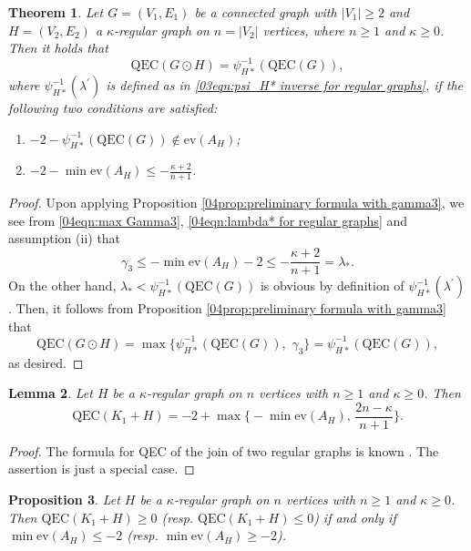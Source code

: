 \documentclass[12pt,a4paper]{article}
\newtheorem{theorem}{Theorem}[section]
\newtheorem{proposition}[theorem]{Proposition}
\newtheorem{lemma}[theorem]{Lemma}
\newcommand{\1}{{\bm 1}}
\numberwithin{equation}{section}
\begin{document}
\begin{theorem}\label{04thm:main formula for regular graph}
Let $G=(V_1,E_1)$ be a connected graph with $|V_1|\ge2$
and $H=(V_2,E_2)$ a $\kappa$-regular graph on $n=|V_2|$
vertices, where $n\ge1$ and $\kappa\ge0$.
Then it holds that
%
\begin{equation}\label{03eqn:QEC(GoH) for a regular H}
\mathrm{QEC}(G\odot H)
=\psi_{H*}^{-1}(\mathrm{QEC}(G)),
\end{equation}
%
where $\psi_{H*}^{-1}(\lambda^\prime)$ is defined as in
\eqref{03eqn:psi_H* inverse for regular graphs},
if the following two conditions are satisfied:
%
\begin{enumerate}
\item[\upshape (i)] 
$-2-\psi_{H*}^{-1}(\mathrm{QEC}(G)) \not\in\mathrm{ev}(A_H)$;
\item[\upshape (ii)]
$\displaystyle -2-\min\mathrm{ev}(A_H)\le -\frac{\kappa+2}{n+1}$.
\end{enumerate}
\end{theorem}

\begin{proof}
Upon applying Proposition \ref{04prop:preliminary formula with gamma3},
we see from \eqref{04eqn:max Gamma3}, 
\eqref{04eqn:lambda* for regular graphs}
and assumption (ii) that
\[
\gamma_3
\le -\min\mathrm{ev}(A_H)-2
\le -\frac{\kappa+2}{n+1}
=\lambda_*.
\]
On the other hand, 
$\lambda_*<\psi_{H*}^{-1}(\mathrm{QEC}(G))$ is obvious
by definition of $\psi_{H*}^{-1}(\lambda^\prime)$.
Then, it follows from
Proposition \ref{04prop:preliminary formula with gamma3} that
\[
\mathrm{QEC}(G\odot H)
=\max \{\psi_{H*}^{-1}(\mathrm{QEC}(G)),\,\,\gamma_3\}
=\psi_{H*}^{-1}(\mathrm{QEC}(G)),
\]
as desired.
\end{proof}


\begin{lemma}\label{04lem:QEC(K1+H) for regular H}
Let $H$ be a $\kappa$-regular graph on $n$ vertices
with $n\ge1$ and $\kappa\ge0$.
Then 
\[
\mathrm{QEC}(K_1+H)
=-2+\max\bigg\{-\min\mathrm{ev}(A_H),\, \frac{2n-\kappa}{n+1}\bigg\}.
\]
\end{lemma}

\begin{proof}
The formula for QEC of the join of two regular graphs is known
\cite{Lou-Obata-Huang2022}.
The assertion is just a special case.
\end{proof}

\begin{proposition}\label{04prop:QEC(K1+H)=0 case}
Let $H$ be a $\kappa$-regular graph on $n$ vertices
with $n\ge1$ and $\kappa\ge0$.
Then $\mathrm{QEC}(K_1+H)\ge0$
(resp. $\mathrm{QEC}(K_1+H)\le0$)
if and only if $\min \mathrm{ev}(A_H)\le-2$
(resp. $\min \mathrm{ev}(A_H)\ge-2$).
\end{proposition}
\end{document}
